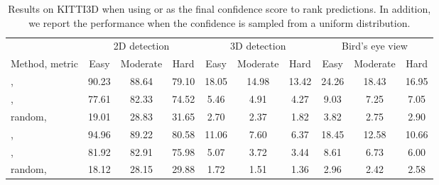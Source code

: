 \documentclass[10pt,twocolumn,letterpaper]{article}
\begin{document}
\begin{table*}[th]
    \centering
    {\footnotesize
    \begin{tabular}{l|ccc|ccc|ccc}
        \toprule
        & \multicolumn{3}{c|}{2D detection} & \multicolumn{3}{c|}{3D detection} & \multicolumn{3}{c}{Bird's eye view} \\
        Method, metric & Easy & Moderate & Hard & Easy & Moderate & Hard & Easy & Moderate & Hard \\
        \midrule
	,  & 90.23 & 88.64 & 79.10 & 18.05 & 14.98 & 13.42 & 24.26 & 18.43 & 16.95 \\
	,  & 77.61 & 82.33 & 74.52 & 5.46 & 4.91 & 4.27 & 9.03 & 7.25 & 7.05 \\
	random,  & 19.01 & 28.83 & 31.65 & 2.70 & 2.37 & 1.82 & 3.82 & 2.75 & 2.90 \\
        \midrule
	,  & 94.96 & 89.22 & 80.58 & 11.06 & 7.60 & 6.37 & 18.45 & 12.58 & 10.66 \\
	,  & 81.92 & 82.91 & 75.98 & 5.07 & 3.72 & 3.44 & 8.61 & 6.73 & 6.00 \\
	random,  & 18.12 & 28.15 & 29.88 & 1.72 & 1.51 & 1.36 & 2.96 & 2.42 & 2.58 \\
        \bottomrule
    \end{tabular}}
    \caption{Results on KITTI3D when using  or  as the final confidence score to rank predictions. In addition, we report the performance when the confidence is sampled from a uniform distribution.}
    \label{tab:conf-2d}
    \vspace{-12pt}
\end{table*}
\end{document}
